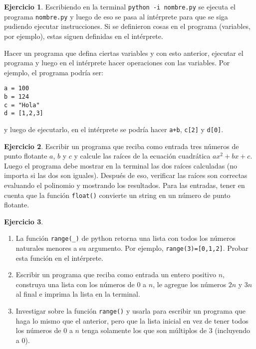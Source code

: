 \documentclass[a4paper,12pt]{book}
\theoremstyle{definition}
\newtheorem{ejercicio}{Ejercicio}
\begin{document}
	\begin{ejercicio}\label{ejer-pythonInteractive}
		Escribiendo en la terminal {\tt python -i nombre.py} se ejecuta el programa {\tt nombre.py} y luego de eso se pasa al intérprete para que se siga pudiendo ejecutar instrucciones. Si se definieron cosas en el programa (variables, por ejemplo), estas siguen definidas en el intérprete.
		
		Hacer un programa que defina ciertas variables y con esto anterior, ejecutar el programa y luego en el intérprete hacer operaciones con las variables.
		Por ejemplo, el programa podría ser:
		\begin{verbatim}
a = 100
b = 124
c = "Hola"
d = [1,2,3]
		\end{verbatim}
		y luego de ejecutarlo, en el intérprete se podría hacer {\tt a+b}, {\tt c[2]} y {\tt d[0]}.
	\end{ejercicio}

	\begin{ejercicio}\label{ejer-polSegGrado}
		Escribir un programa que reciba como entrada tres números de punto flotante $a$, $b$ y $c$ y calcule las raíces de la ecuación cuadrática $ax^2+bx+c$. Luego el programa debe mostrar en la terminal las dos raíces calculadas (no importa si las dos son iguales). Después de eso, verificar las raíces son correctas evaluando el polinomio y mostrando los resultados. Para las entradas, tener en cuenta que la función {\tt float()} convierte un string en un número de punto flotante.
	\end{ejercicio}
	
	\begin{ejercicio}
		\begin{enumerate}
			\item La función {\tt range(\_)} de python retorna una lista con todos los números naturales menores a su argumento. Por ejemplo, {\tt range(3)=[0,1,2]}. Probar esta función en el intérprete.
			\item Escribir un programa que reciba como entrada un entero positivo $n$, construya una lista con los números de $0$ a $n$, le agregue los números $2n$ y $3n$ al final e imprima la lista en la terminal.
			\item Investigar sobre la función {\tt range()} y usarla para escribir un programa que haga lo mismo que el anterior, pero que la lista inicial en vez de tener todos los números de $0$ a $n$ tenga solamente los que son múltiplos de $3$ (incluyendo a $0$).
		\end{enumerate}
	\end{ejercicio}
	
\end{document}
